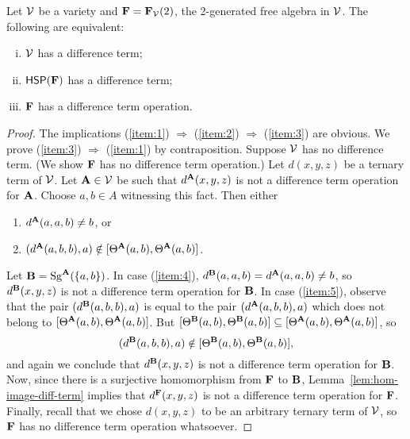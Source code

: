 \begin{thm}
  \label{thm:F}
Let $\mathcal{V}$ be a variety and $\mathbf{F} = \mathbf{F}_{\mathcal{V}}(2)$, the 2-generated
free algebra in $\mathcal{V}$. The following are equivalent:
\begin{enumerate}[(i)]
\item \label{item:1}
  $\mathcal{V}$ has a difference term;
\item \label{item:2}
  $\mathsf{H} \mathsf{S} \mathsf{P} (\mathbf{F})$ has a difference term;
\item \label{item:3}
  $\mathbf{F}$ has a difference term operation.
\end{enumerate}
\end{thm}
\begin{proof}
  The implications
  (\ref{item:1}) $\Rightarrow$  (\ref{item:2}) $\Rightarrow$  (\ref{item:3}) are
  obvious. We prove
  (\ref{item:3}) $\Rightarrow$  (\ref{item:1}) by contraposition.
  Suppose $\mathcal{V}$ has no difference term. (We show $\mathbf{F}$ has no difference term
  operation.)
  Let $d(x,y,z)$ be a ternary term of $\mathcal{V}$.  Let $\mathbf{A}\in \mathcal{V}$ be such that
  $d^{\mathbf{A}}(x,y,z)$ is not a difference term operation for $\mathbf{A}$.
  Choose $a, b \in A$ witnessing this fact.  Then either
  \begin{enumerate}
  \item\label{item:4} $d^{\mathbf{A}}(a,a,b) \neq b$, or
  \item\label{item:5} $(d^{\mathbf{A}}(a,b,b), a) \notin [\Theta^{\mathbf{A}} (a, b), \Theta^{\mathbf{A}} (a,b)]$.
  \end{enumerate}
  Let $\mathbf{B} = \operatorname{Sg}^{\mathbf{A}} (\{a, b\})$.  In case
  (\ref{item:4}), 
  $d^{\mathbf{B}}(a,a,b) = d^{\mathbf{A}}(a,a,b) \neq b$, so $d^{\mathbf{B}}(x,y,z)$ is not a difference
  term operation for $\mathbf{B}$.
  In case (\ref{item:5}), observe that
  the pair $(d^{\mathbf{B}}(a,b,b), a)$ is equal to the pair $(d^{\mathbf{A}}(a,b,b), a)$ which
  does not belong to $[\Theta^{\mathbf{A}} (a, b), \Theta^{\mathbf{A}} (a,b)]$.
  But 
  $[\Theta^{\mathbf{B}} (a, b), \Theta^{\mathbf{B}} (a,b)] \subseteq[\Theta^{\mathbf{A}} (a, b), \Theta^{\mathbf{A}} (a,b)]$, so
  \[(d^{\mathbf{B}}(a,b,b), a) \notin [\Theta^{\mathbf{B}} (a, b), \Theta^{\mathbf{B}} (a,b)],\]
  and again we conclude that $d^{\mathbf{B}}(x,y,z)$ is not a difference term operation for $\mathbf{B}$.
  Now, since there is a surjective homomorphism from $\mathbf{F}$ to $\mathbf{B}$,
  Lemma~\ref{lem:hom-image-diff-term} implies that $d^{\mathbf{F}}(x,y,z)$ 
  is not a difference term operation for $\mathbf{F}$.
  Finally, recall that we chose $d(x,y,z)$ to be an arbitrary ternary term of $\mathcal{V}$, so
  $\mathbf{F}$ has no difference term operation whatsoever.
\end{proof}


\draftsecskip


